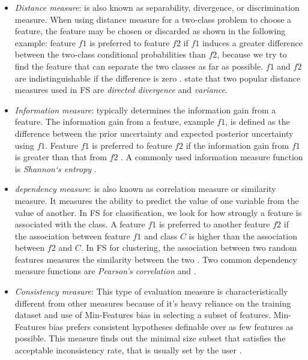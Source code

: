 \begin{itemize}
  \item \textit{Distance measure}: is also known as separability, divergence, or discrimination measure. When using distance measure for a two-class problem to choose a feature, the feature may be chosen or discarded as shown in the following example: feature $f1$ is preferred to feature $f2$ if $f1$ induces a greater difference between the two-class conditional probabilities than $f2$, because we try to find the feature that can separate the two classes as far as possible. $f1$ and $f2$ are indistinguishable if the difference is zero \citep{liu2005toward}. \citet{de2015feature} state that two popular distance measures used in FS are \textit{directed divergence} and \textit{variance}.
  \item \textit{Information measure}: typically determines the information gain from a feature. The information gain from a feature, example $f1$, is defined as the difference between the prior uncertainty and expected posterior uncertainty using $f1$. Feature $f1$ is preferred to feature $f2$ if the information gain from $f1$ is greater than that from $f2$ \citep{liu2005toward}. A commonly used information measure function is \textit{Shannon`s entropy} \citep{de2015feature}.
  \item \textit{dependency measure}: is also known as correlation measure or similarity measure. It measures the ability to predict the value of one variable from the value of another. In FS for classification, we look for how strongly a feature is associated with the class. A feature $f1$ is preferred to another feature $f2$ if the association between feature $f1$ and class $C$ is higher than the association between $f2$ and $C$. In FS for clustering, the association between two random features measures the similarity between the two \citep{liu2005toward}. Two common dependency measure functions are \textit{Pearson's correlation} and \citep{de2015feature}.
  \item \textit{Consistency measure}: This type of evaluation measure is characteristically different from other measures because of it's heavy reliance on the training dataset and use of Min-Features bias in selecting a subset of features. Min-Features bias prefers consistent hypotheses definable over as few features as possible. This measure finds out the minimal size subset that satisfies the acceptable inconsistency rate, that is usually set by the user \citep{liu2005toward}.
\end{itemize}

